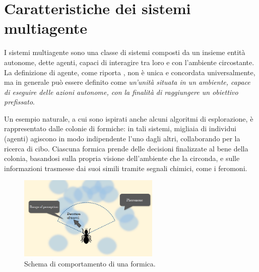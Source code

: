 \section{Caratteristiche dei sistemi multiagente} \label{sec:sistemi_multiagente}

I sistemi multiagente sono una classe di sistemi composti da un insieme entità autonome, dette agenti, capaci di interagire tra loro e con l'ambiente circostante.
La definizione di agente, come riporta \cite{WooldridgeMichaelJ.1966-2002Aitm}, non è unica e concordata universalmente, ma in generale può essere definito come \textit{un'unità situata in un ambiente, capace di eseguire delle azioni autonome, con la finalità di raggiungere un obiettivo prefissato}.

Un esempio naturale, a cui sono ispirati anche alcuni algoritmi di esplorazione, è rappresentato dalle colonie di formiche: in tali sistemi, migliaia di individui (agenti) agiscono in modo indipendente l'uno dagli altri, collaborando per la ricerca di cibo.
Ciascuna formica prende delle decisioni finalizzate al bene della colonia, basandosi sulla propria visione dell'ambiente che la circonda, e sulle informazioni trasmesse dai suoi simili tramite segnali chimici, come i feromoni.
\begin{figure}[h]
    \centering
    \includegraphics[width=0.6\textwidth]{img/ch1/esempio_formiche_tesi.png}
    \caption{Schema di comportamento di una formica.}
    \label{fig:schema_formica}
\end{figure}


